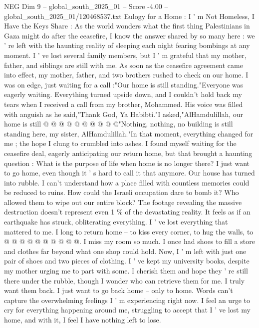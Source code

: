\begin{textsample}{NEG Dim 9 – global\_south\_2025\_01 – Score -4.00 – global\_south\_2025\_01/120468537.txt}  \label{ex:f9_neg_114}
Eulogy for a Home : I ' m Not Homeless, I Have the Keys Share : As the world wonders what the first thing Palestinians in Gaza might do after the ceasefire, I know the answer shared by so many here : we ' re left with the haunting reality of sleeping each night fearing bombings at any moment.
I ' ve lost several family members, but I ' m grateful that my mother, father, and siblings are still with me.
As soon as the ceasefire agreement came into effect, my mother, father, and two brothers rushed to check on our home.
I was on edge, just waiting for a call :"Our home is still standing."Everyone was eagerly waiting.
Everything turned upside down, and I couldn't hold back my tears when I received a call from my brother, Mohammed.
His voice was filled with anguish as he said,"Thank God, Ya Habibti."I asked,"AlHamdulillah, our home is still @ @ @ @ @ @ @ @ @ @"Nothing, nothing, no building is still standing here, my sister, AlHamdulillah."In that moment, everything changed for me ; the hope I clung to crumbled into ashes.
I found myself waiting for the ceasefire deal, eagerly anticipating our return home, but that brought a haunting question : What is the purpose of life when home is no longer there?
I just want to go home, even though it ' s hard to call it that anymore.
Our house has turned into rubble.
I can't understand how a place filled with countless memories could be reduced to ruins.
How could the Israeli occupation dare to bomb it?
Who allowed them to wipe out our entire block?
The footage revealing the massive destruction doesn't represent even 1 \% of the devastating reality.
It feels as if an earthquake has struck, obliterating everything.
I ' ve lost everything that mattered to me.
I long to return home -- to kiss every corner, to hug the walls, to @ @ @ @ @ @ @ @ @ @.
I miss my room so much.
I once had shoes to fill a store and clothes far beyond what one shop could hold.
Now, I ' m left with just one pair of shoes and two pieces of clothing.
I ' ve kept my university books, despite my mother urging me to part with some.
I cherish them and hope they ' re still there under the rubble, though I wonder who can retrieve them for me.
I truly want them back.
I just want to go back home -- only to home.
Words can't capture the overwhelming feelings I ' m experiencing right now.
I feel an urge to cry for everything happening around me, struggling to accept that I ' ve lost my home, and with it, I feel I have nothing left to lose.

\end{textsample}
